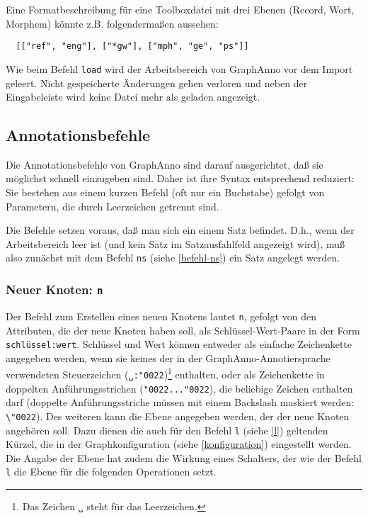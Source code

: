 \documentclass[12pt]{scrartcl}
\begin{document}
Eine Formatbeschreibung für eine Toolboxdatei mit drei Ebenen (Record, Wort, Morphem) könnte z.B. folgendermaßen aussehen:
\begin{verbatim}
  [["ref", "eng"], ["*gw"], ["mph", "ge", "ps"]]
\end{verbatim}

Wie beim Befehl \texttt{load} wird der Arbeitsbereich von GraphAnno vor dem Import geleert. Nicht gespeicherte Änderungen gehen verloren und neben der Eingabeleiste wird keine Datei mehr als geladen angezeigt.


\subsection{Annotationsbefehle}

Die Annotationsbefehle von GraphAnno sind darauf ausgerichtet, daß sie möglichst schnell einzugeben sind. Daher ist ihre Syntax entsprechend reduziert: Sie bestehen aus einem kurzen Befehl (oft nur ein Buchstabe) gefolgt von Parametern, die durch Leerzeichen getrennt sind.

Die Befehle setzen voraus, daß man sich ein einem Satz befindet. D.h., wenn der Arbeitsbereich leer ist (und kein Satz im Satzausfahlfeld angezeigt wird), muß also zunächst mit dem Befehl \texttt{ns} (siehe \ref{befehl-ns}) ein Satz angelegt werden.


\subsubsection{Neuer Knoten: \texttt{n}}\label{befehl-n}

Der Befehl zum Erstellen eines neuen Knotens lautet \texttt{n}, gefolgt von den Attributen, die der neue Knoten haben soll, als Schlüssel-Wert-Paare in der Form \texttt{schlüssel:wert}. Schlüssel und Wert können entweder als einfache Zeichenkette angegeben werden, wenn sie keines der in der GraphAnno-Annotiersprache verwendeten Steuerzeichen (\texttt{␣:\char"0022})\footnote{Das Zeichen \texttt{␣} steht für das Leerzeichen.} enthalten, oder als Zeichenkette in doppelten Anführungsstrichen (\texttt{\char"0022...\char"0022}), die beliebige Zeichen enthalten darf (doppelte Anführungsstriche müssen mit einem Backslash maskiert werden: \texttt{\textbackslash\char"0022}).
Des weiteren kann die Ebene angegeben werden, der der neue Knoten angehören soll. Dazu dienen die auch für den Befehl \texttt{l} (siehe \ref{l}) geltenden Kürzel, die in der Graphkonfiguration (siehe \ref{konfiguration}) eingestellt werden. Die Angabe der Ebene hat zudem die Wirkung eines Schalters, der wie der Befehl \texttt{l} die Ebene für die folgenden Operationen setzt.
\end{document}
